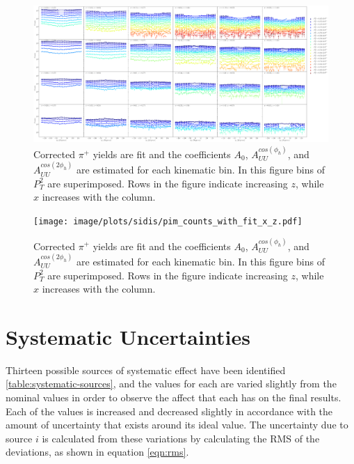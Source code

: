 \begin{figure}
	\centering
	\includegraphics[width=\textwidth]{image/plots/sidis/pip_counts_with_fit_x_z.pdf}	
	\caption[Corrected yield fits for $\pi^+$]{Corrected $\pi^+$ yields are fit and the coefficients $A_{0}$, $A_{UU}^{cos(\phi_h)}$, and $A_{UU}^{cos(2\phi_h)}$ are estimated for each kinematic bin.  In this figure bins of $P_T^2$ are superimposed.  Rows in the figure indicate increasing $z$, while $x$ increases with the column.}
		\label{fig:pip-datafit}

\end{figure}

\begin{figure}
	\centering
	\texttt{[image: image/plots/sidis/pim\_counts\_with\_fit\_x\_z.pdf]}	
	\caption[Corrected yield fits for $\pi^-$]{Corrected $\pi^+$ yields are fit and the coefficients $A_{0}$, $A_{UU}^{cos(\phi_h)}$, and $A_{UU}^{cos(2\phi_h)}$ are estimated for each kinematic bin.  In this figure bins of $P_T^2$ are superimposed.  Rows in the figure indicate increasing $z$, while $x$ increases with the column.}
		\label{fig:pim-datafit}

\end{figure}

\section{Systematic Uncertainties}
Thirteen possible sources of systematic effect have been identified \ref{table:systematic-sources}, and the values for each are varied slightly from the nominal values in order to observe the affect that each has on the final results.  Each of the values is increased and decreased slightly in accordance with the amount of uncertainty that exists around its ideal value.  The uncertainty due to source $i$ is calculated from these variations by calculating the RMS of the deviations, as shown in equation \ref{eqn:rms}.

